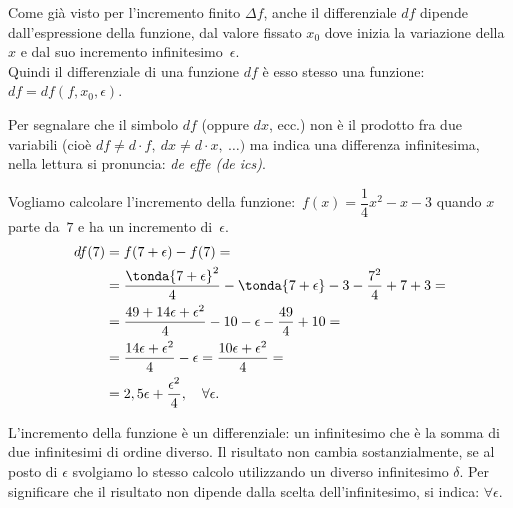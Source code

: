 Come già visto per l'incremento finito \(\Delta f\), anche il differenziale 
\(df\) 
dipende dall'espressione della funzione, dal valore fissato \(x_0\) dove inizia 
la variazione della \(x\) e dal suo incremento infinitesimo~\(\epsilon\).\\
Quindi il differenziale di una funzione \(df\) è esso stesso  una funzione:
\(df=df(f, x_0, \epsilon)\). 

\begin{osservazione}
Per segnalare che il simbolo \(df\) (oppure \(dx\), ecc.) non è il prodotto fra 
due variabili (cioè \(df\ne d \cdot f,\ dx\ne d\cdot x,\ \dots)\) ma indica 
una differenza infinitesima, nella lettura si pronuncia:
\textit{de effe (de ics)}.
\end{osservazione}

\begin{minipage}{.48 \textwidth}
\begin{esempio}
Vogliamo calcolare l'incremento della 
funzione:~\(f(x) = \dfrac{1}{4} x^2 -x -3\)
quando \(x\) parte da~\(7\) e ha un incremento di~\(\epsilon\).
\begin{align*}
  df(7) &= f(7+\epsilon) - f(7) = \\
        &= \dfrac{\tonda{7 +\epsilon}^2}{4}  -\tonda{7 +\epsilon} -3 - 
           \dfrac{7^2}{4}  +7 +3 =\\
        &= \dfrac{49 +14 \epsilon +\epsilon^2}{4} -10 -\epsilon - 
           \dfrac{49}{4} +10 =\\
        &= \dfrac{14 \epsilon +\epsilon^2}{4} -\epsilon 
        = \dfrac{10 \epsilon +\epsilon^2}{4} =\\
        &= 2,5 \epsilon + \dfrac{\epsilon^2}{4}, \quad \forall \epsilon. 
\end{align*}
\end{esempio}
\end{minipage}
 \hfill
\begin{minipage}{.48 \textwidth}
 \begin{center}
\differenziale
 \end{center}
\end{minipage}
L'incremento della funzione è un differenziale: un infinitesimo che è la somma 
di due infinitesimi di ordine diverso. Il risultato non cambia 
sostanzialmente, se al posto di \(\epsilon\) svolgiamo lo stesso calcolo 
utilizzando un diverso infinitesimo \(\delta\). Per significare che il 
risultato non dipende dalla scelta dell'infinitesimo, si indica: \(\forall 
\epsilon\).

